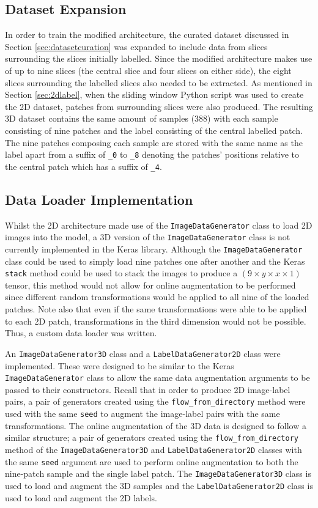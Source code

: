 \subsection{Dataset Expansion}

In order to train the modified architecture, the curated dataset discussed in Section \ref{sec:datasetcuration} was expanded to include data from slices surrounding the slices initially labelled. Since the modified architecture makes use of up to nine slices (the central slice and four slices on either side), the eight slices surrounding the labelled slices also needed to be extracted. As mentioned in Section \ref{sec:2dlabel}, when the sliding window Python script was used to create the 2D dataset, patches from surrounding slices were also produced. The resulting 3D dataset contains the same amount of samples (388) with each sample consisting of nine patches and the label consisting of the central labelled patch. The nine patches composing each sample are stored with the same name as the label apart from a suffix of \texttt{\_0} to \texttt{\_8} denoting the patches' positions relative to the central patch which has a suffix of \texttt{\_4}.

\subsection{Data Loader Implementation}

Whilst the 2D architecture made use of the \texttt{ImageDataGenerator} class to load 2D images into the model, a 3D version of the \texttt{ImageDataGenerator} class is not currently implemented in the Keras library. Although the \texttt{ImageDataGenerator} class could be used to simply load nine patches one after another and the Keras \texttt{stack} method could be used to stack the images to produce a $(9 \times y \times x \times 1)$ tensor, this method would not allow for online augmentation to be performed since different random transformations would be applied to all nine of the loaded patches. Note also that even if the same transformations were able to be applied to each 2D patch, transformations in the third dimension would not be possible. Thus, a custom data loader was written.

An \texttt{ImageDataGenerator3D} class and a \texttt{LabelDataGenerator2D} class were implemented. These were designed to be similar to the Keras \texttt{ImageDataGenerator} class to allow the same data augmentation arguments to be passed to their constructors. Recall that in order to produce 2D image-label pairs, a pair of generators created using the \texttt{flow\_from\_directory} method were used with the same \texttt{seed} to augment the image-label pairs with the same transformations. The online augmentation of the 3D data is designed to follow a similar structure; a pair of generators created using the \texttt{flow\_from\_directory} method of the \texttt{ImageDataGenerator3D} and \texttt{LabelDataGenerator2D} classes with the same \texttt{seed} argument are used to perform online augmentation to both the nine-patch sample and the single label patch. The \texttt{ImageDataGenerator3D} class is used to load and augment the 3D samples and the \texttt{LabelDataGenerator2D} class is used to load and augment the 2D labels.

